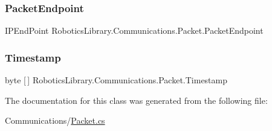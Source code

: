 \subsubsection{\texorpdfstring{Packet\+Endpoint}{PacketEndpoint}}
{\footnotesize\ttfamily I\+P\+End\+Point Robotics\+Library.\+Communications.\+Packet.\+Packet\+Endpoint\hspace{0.3cm}{\ttfamily [private]}}

\mbox{\label{class_robotics_library_1_1_communications_1_1_packet_aeaf9b3ec1923f1126c2025b1dd909468}} 
\subsubsection{\texorpdfstring{Timestamp}{Timestamp}}
{\footnotesize\ttfamily byte \mbox{[}$\,$\mbox{]} Robotics\+Library.\+Communications.\+Packet.\+Timestamp\hspace{0.3cm}{\ttfamily [private]}}



The documentation for this class was generated from the following file\+:\begin{DoxyCompactItemize}
\item 
Communications/\hyperlink{_packet_8cs}{Packet.\+cs}\end{DoxyCompactItemize}
